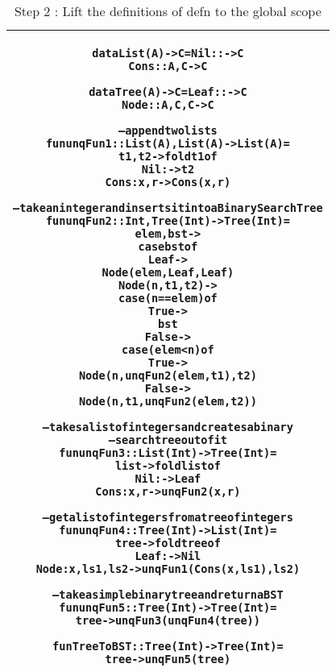 \documentclass[11pt]{article}
\begin{document}
\begin{table}
\begin{center}
\begin{tabular}{|c|}\hline
\begin{minipage}{5in}
\begin{alltt}

    data List(A) -> C = Nil  ::     -> C
                        Cons :: A,C -> C 

    data Tree(A) -> C = Leaf :: -> C
                    Node :: A,C,C -> C                    
    
    -- append two lists
    fun unqFun1 :: List(A),List(A) -> List(A) =
      t1,t2 -> fold t1 of
                 Nil  :    -> t2
                 Cons :x,r -> Cons(x,r)

    -- take an integer and inserts it into a Binary Search Tree 
    fun unqFun2 :: Int,Tree(Int) -> Tree(Int) =
      elem,bst ->
        case bst of
          Leaf -> 
            Node (elem,Leaf,Leaf) 
          Node(n,t1,t2) -> 
            case (n == elem) of
              True  -> 
                bst 
              False ->
                case (elem < n) of
                  True ->
                    Node (n,unqFun2 (elem,t1),t2)
                  False ->
                    Node (n,t1,unqFun2 (elem,t2))

    -- takes a list of integers and creates a binary
    -- search tree out of it
    fun unqFun3 :: List(Int) -> Tree(Int) =
      list -> fold list of
                Nil  :     -> Leaf
                Cons : x,r -> unqFun2 (x,r)  
    
    -- get a list of integers from a tree of integers
    fun unqFun4 :: Tree(Int) -> List(Int) = 
      tree -> fold tree of
                Leaf : -> Nil
                Node :x,ls1,ls2 -> unqFun1 (Cons(x,ls1),ls2)

    -- take a simple binary tree and return a BST
    fun unqFun5 :: Tree(Int) -> Tree(Int) =
      tree -> unqFun3 (unqFun4 (tree))


    fun TreeToBST :: Tree(Int) -> Tree(Int) =
      tree -> unqFun5(tree)

\end{alltt} 
\end {minipage} 
\tabularnewline
\hline
\end{tabular}
\caption{Step 2 : Lift the definitions of {\sf defn} to the global scope}
\label{lam:LamLiftDefn2}
\end{center}
\end{table}
\end{document}
